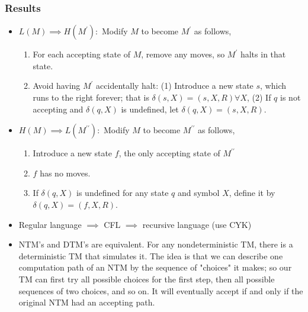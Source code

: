 \subsubsection{Results}
\begin{itemize}
    \item $L(M) \implies H(M^\prime):$ Modify $M$ to become $M^\prime$ as follows, 
    \begin{enumerate}
        \item For each accepting state of $M$, remove any moves, so $M^\prime$ halts in that state.
        \item Avoid having $M^\prime$ accidentally halt: (1) Introduce a new state $s$, which runs to the right forever; that is $\delta (s, X) = (s, X, R) \forall X$, (2) If $q$ is not accepting and $\delta(q, X)$ is undefined, let $\delta (q, X) = (s, X, R).$
    \end{enumerate}
    \item $H(M) \implies L(M^{\prime\prime}):$ Modify $M$ to become $M^{\prime\prime}$ as follows, 
    \begin{enumerate}
        \item Introduce a new state $f$, the only accepting state of $M^{\prime\prime}$
        \item $f$ has no moves.
        \item If $\delta(q, X)$ is undefined for any state $q$ and symbol $X$, define it by $\delta(q, X) = (f, X, R)$.
    \end{enumerate}
    \item Regular language $\implies$ CFL $\implies$ recursive language (use CYK) 
    \item NTM's and DTM's are equivalent. For any nondeterministic TM, there is a deterministic TM that simulates it. The idea is that we can describe one computation path of an NTM by the sequence of "choices" it makes; so our TM can first try all possible choices for the first step, then all possible sequences of two choices, and so on. It will eventually accept if and only if the original NTM had an accepting path.
\end{itemize}
